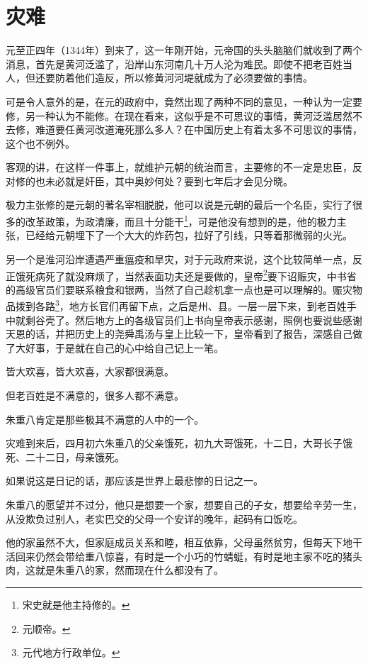 \section{灾难}
\ifnum{}
	\begin{multicols}{\theparacolNo}
		\fi
		元至正四年（1344年）到来了，这一年刚开始，元帝国的头头脑脑们就收到了两个消息，首先是黄河泛滥了，沿岸山东河南几十万人沦为难民。即使不把老百姓当人，但还要防着他们造反，所以修黄河河堤就成为了必须要做的事情。

		可是令人意外的是，在元的政府中，竟然出现了两种不同的意见，一种认为一定要修，另一种认为不能修。在现在看来，这似乎是不可思议的事情，黄河泛滥居然不去修，难道要任黄河改道淹死那么多人？在中国历史上有着太多不可思议的事情，这个也不例外。

		客观的讲，在这样一件事上，就维护元朝的统治而言，主要修的不一定是忠臣，反对修的也未必就是奸臣，其中奥妙何处？要到七年后才会见分晓。

		极力主张修的是元朝的著名宰相脱脱，他可以说是元朝的最后一个名臣，实行了很多的改革政策，为政清廉，而且十分能干\footnote{宋史就是他主持修的。}，可是他没有想到的是，他的极力主张，已经给元朝埋下了一个大大的炸药包，拉好了引线，只等着那微弱的火光。

		另一个是淮河沿岸遭遇严重瘟疫和旱灾，对于元政府来说，这个比较简单一点，反正饿死病死了就没麻烦了，当然表面功夫还是要做的，皇帝\footnote{元顺帝。}要下诏赈灾，中书省的高级官员们要联系粮食和银两，当然了自己趁机拿一点也是可以理解的。赈灾物品拨到各路\footnote{元代地方行政单位。}，地方长官们再留下点，之后是州、县。一层一层下来，到老百姓手中就剩谷壳了。然后地方上的各级官员们上书向皇帝表示感谢，照例也要说些感谢天恩的话，并把历史上的尧舜禹汤与皇上比较一下，皇帝看到了报告，深感自己做了大好事，于是就在自己的心中给自己记上一笔。

		皆大欢喜，皆大欢喜，大家都很满意。

		但老百姓是不满意的，很多人都不满意。

		朱重八肯定是那些极其不满意的人中的一个。

		灾难到来后，四月初六朱重八的父亲饿死，初九大哥饿死，十二日，大哥长子饿死、二十二日，母亲饿死。

		如果说这是日记的话，那应该是世界上最悲惨的日记之一。

		朱重八的愿望并不过分，他只是想要一个家，想要自己的子女，想要给辛劳一生，从没欺负过别人，老实巴交的父母一个安详的晚年，起码有口饭吃。

		他的家虽然不大，但家庭成员关系和睦，相互依靠，父母虽然贫穷，但每天下地干活回来仍然会带给重八惊喜，有时是一个小巧的竹蜻蜓，有时是地主家不吃的猪头肉，这就是朱重八的家，然而现在什么都没有了。


\end{multicols}
